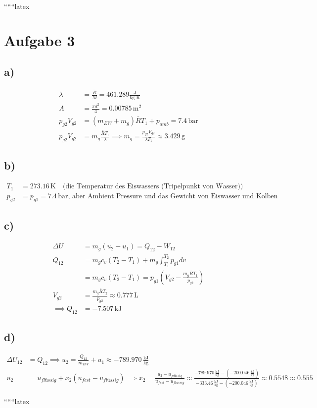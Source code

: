 
``````latex


\section*{Aufgabe 3}

\subsection*{a)}
\begin{align*}
\lambda &= \frac{\bar{R}}{M} = 461.289 \frac{\text{J}}{\text{kg K}} \\
A &= \frac{\pi d^2}{4} = 0.00785 \, \text{m}^2 \\
p_{g2} V_{g2} &= (m_{EW} + m_g) \bar{R} T_1 + p_{amb} = 7.4 \, \text{bar} \\
p_{g2} V_{g2} &= m_g \frac{\bar{R} T_1}{\lambda} \implies m_g = \frac{p_{g2} V_{g2}}{\lambda T_1} \approx 3.429 \, \text{g}
\end{align*}

\subsection*{b)}
\begin{align*}
T_1 &= 273.16 \, \text{K} \quad \text{(die Temperatur des Eiswassers (Tripelpunkt von Wasser))} \\
p_{g2} &= p_{g1} = 7.4 \, \text{bar, aber Ambient Pressure und das Gewicht von Eiswasser und Kolben bleiben unverändert.}
\end{align*}

\subsection*{c)}
\begin{align*}
\Delta U &= m_g (u_2 - u_1) = Q_{12} - W_{12} \\
Q_{12} &= m_g c_v (T_2 - T_1) + m_g \int_{T_1}^{T_2} p_{g1} dv \\
&= m_g c_v (T_2 - T_1) = p_{g1} \left( V_{g2} - \frac{m_g \bar{R} T_1}{p_{g2}} \right) \\
V_{g2} &= \frac{m_g \bar{R} T_2}{p_{g2}} \approx 0.777 \, \text{L} \\
\implies Q_{12} &= -7.507 \, \text{kJ}
\end{align*}

\subsection*{d)}
\begin{align*}
\Delta U_{12} &= Q_{12} \implies u_2 = \frac{Q_{12}}{m_{EW}} + u_1 \approx -789.970 \, \frac{\text{kJ}}{\text{kg}} \\
u_2 &= u_{flüssig} + x_2 (u_{fest} - u_{flüssig}) \implies x_2 = \frac{u_2 - u_{flüssig}}{u_{fest} - u_{flüssig}} \approx \frac{-789.970 \, \frac{\text{kJ}}{\text{kg}} - (-200.046 \, \frac{\text{kJ}}{\text{kg}})}{-333.46 \, \frac{\text{kJ}}{\text{kg}} - (-200.046 \, \frac{\text{kJ}}{\text{kg}})} \approx 0.5548 \approx 0.555
\end{align*}


``````latex


